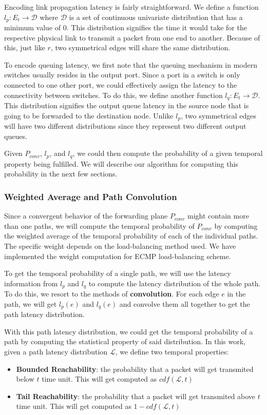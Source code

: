 \documentclass[10pt,sigconf,letterpaper,anonymous,nonacm]{acmart}
\begin{document}
Encoding link propagation latency is fairly straightforward. 
We define a function $l_p: E_t \rightarrow \mathcal{D}$ where $\mathcal{D}$ is a set of 
continuous univariate distribution that has a minimum value of $0$.
This distribution signifies the time it would take for the respective physical link to transmit 
a packet from one end to another.
Because of this, just like $r$, two symmetrical edges will share the same distribution.

To encode queuing latency, we first note that the queuing mechanism in modern switches 
usually resides in the output port. %
Since a port in a switch is only connected to one other port, we could effectively 
assign the latency to the connectivity between switches.
To do this, we define another function $l_q: E_t \rightarrow \mathcal{D}$.
This distribution signifies the output queue latency in the source node that is 
going to be forwarded to the destination node.
Unlike $l_p$, two symmetrical edges will have two different distributions since they 
represent two different output queues.

Given $P_{conv}$, $l_p$, and $l_q$, we could then compute the probability of a given 
temporal property being fulfilled.
We will describe our algorithm for computing this probability in the next few 
sections.

\subsubsection{Weighted Average and Path Convolution}
Since a convergent behavior of the forwarding plane $P_{conv}$ might contain more than 
one paths, we will compute the temporal probability of $P_{conv}$ by computing the 
weighted average of the temporal probability of each of the individual paths.
The specific weight depends on the load-balancing method used.
We have implemented the weight computation for ECMP load-balancing scheme.

To get the temporal probability of a single path, we will use the latency information 
from $l_p$ and $l_q$ to compute the latency distribution of the whole path.
To do this, we resort to the methods of \textbf{convolution}.
For each edge $e$ in the path, we will get $l_p(e)$ and $l_q(e)$ and convolve them 
all together to get the path latency distribution.

With this path latency distribution, we could get the temporal probability of a 
path by computing the statistical property of said distribution.
In this work, given a path latency distribution $\mathcal{L}$, we define two temporal 
properties:
\begin{itemize}
    \item \textbf{Bounded Reachability}: the probability that a packet will get 
        transmited below $t$ time unit. This will get computed as $cdf(\mathcal{L}, t)$
    \item \textbf{Tail Reachability}: the probability that a packet will get 
        transmited above $t$ time unit. This will get computed as 
        $1 - cdf(\mathcal{L}, t)$
\end{itemize}
\end{document}
